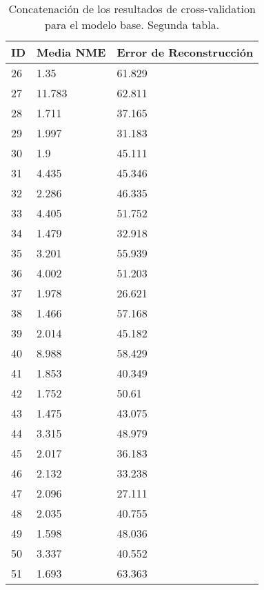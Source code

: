\begin{table}[!ht]
    \centering
    \caption{Concatenación de los resultados de cross-validation para el modelo base. Segunda tabla.}
    \begin{tabular}{|l|l|l|}
    \hline
        \cellcolor{gray!25}\textbf{ID} & \cellcolor{gray!25}\textbf{Media NME} & \cellcolor{gray!25}\textbf{Error de Reconstrucción} \\ \hline
        26 & 1.35 & 61.829 \\ \hline
        27 & 11.783 & 62.811 \\ \hline
        28 & 1.711 & 37.165 \\ \hline
        29 & 1.997 & 31.183 \\ \hline
        30 & 1.9 & 45.111 \\ \hline
        31 & 4.435 & 45.346 \\ \hline
        32 & 2.286 & 46.335 \\ \hline
        33 & 4.405 & 51.752 \\ \hline
        34 & 1.479 & 32.918 \\ \hline
        35 & 3.201 & 55.939 \\ \hline
        36 & 4.002 & 51.203 \\ \hline
        37 & 1.978 & 26.621 \\ \hline
        38 & 1.466 & 57.168 \\ \hline
        39 & 2.014 & 45.182 \\ \hline
        40 & 8.988 & 58.429 \\ \hline
        41 & 1.853 & 40.349 \\ \hline
        42 & 1.752 & 50.61 \\ \hline
        43 & 1.475 & 43.075 \\ \hline
        44 & 3.315 & 48.979 \\ \hline
        45 & 2.017 & 36.183 \\ \hline
        46 & 2.132 & 33.238 \\ \hline
        47 & 2.096 & 27.111 \\ \hline
        48 & 2.035 & 40.755 \\ \hline
        49 & 1.598 & 48.036 \\ \hline
        50 & 3.337 & 40.552 \\ \hline
        51 & 1.693 & 63.363 \\ \hline
    \end{tabular}
    \label{table:ModelBase_landmarkresume}
\end{table}


